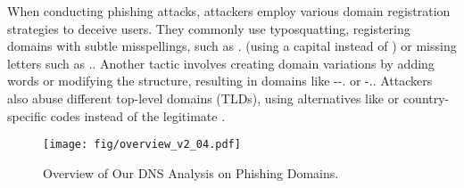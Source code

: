 When conducting phishing attacks, attackers employ various domain registration strategies to deceive users. 
They commonly use typosquatting, registering domains with subtle misspellings, such as . (using a capital  instead of ) or missing letters such as ..
Another tactic involves creating domain variations by adding words or modifying the structure, resulting in domains like --. or -..
Attackers also abuse different top-level domains (TLDs), using alternatives like  or country-specific codes instead of the legitimate .
\vspace{-10px}


\begin{figure*}[!t]
    \centering
    \texttt{[image: fig/overview\_v2\_04.pdf]}
    \vspace{-10px}
    \caption{Overview of Our DNS Analysis on Phishing Domains.}
    \label{fig:overview}
\end{figure*}
